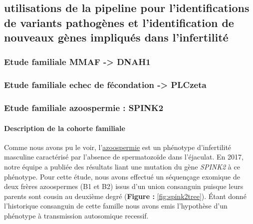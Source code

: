 \documentclass[12pt,twoside]{reedthesis}
\theoremstyle{definition}
\theoremstyle{definition}
\theoremstyle{remark}
\begin{document}
  \subsection{utilisations de la pipeline pour l'identifications de
  variants pathogènes et l'identification de nouveaux gènes impliqués dans
  l'infertilité}\label{utilisations-de-la-pipeline-pour-lidentifications-de-variants-pathogenes-et-lidentification-de-nouveaux-genes-impliques-dans-linfertilite}
  
  \newpage  
  
  \hypertarget{famdnah1}{\subsubsection{Etude familiale MMAF
  -\textgreater{} DNAH1}\label{famdnah1}}
  
  \newpage  
  
  \hypertarget{plcz}{\subsubsection{Etude familiale echec de fécondation
  -\textgreater{} PLCzeta}\label{plcz}}
  
  \newpage  
  
  \hypertarget{spink2}{\subsubsection{Etude familiale azoospermie :
  SPINK2}\label{spink2}}
  
  \paragraph{Description de la cohorte
  familiale}\label{description-de-la-cohorte-familiale}
  
  Comme nous avons pu le voir, l'\protect\hyperlink{infquant}{azoospermie}
  est un phénotype d'infertilité masculine caractérisé par l'absence de
  spermatozoïde dans l'éjaculat. En 2017, notre équipe a publiée des
  résultats liant une mutation du gène \emph{SPINK2} à ce phénotype. Pour
  cette étude, nous avons effectué un séquençage exomique de deux frères
  azoospermes (B1 et B2) issus d'un union consanguin puisque leurs parents
  sont cousin au deuxième degré (\textbf{Figure : }\ref{fig:spink2tree}).
  Étant donné l'historique consanguin de cette famille nous avons emis
  l'hypothèse d'un phénotype à transmission autosomique recessif.
  
\end{document}
